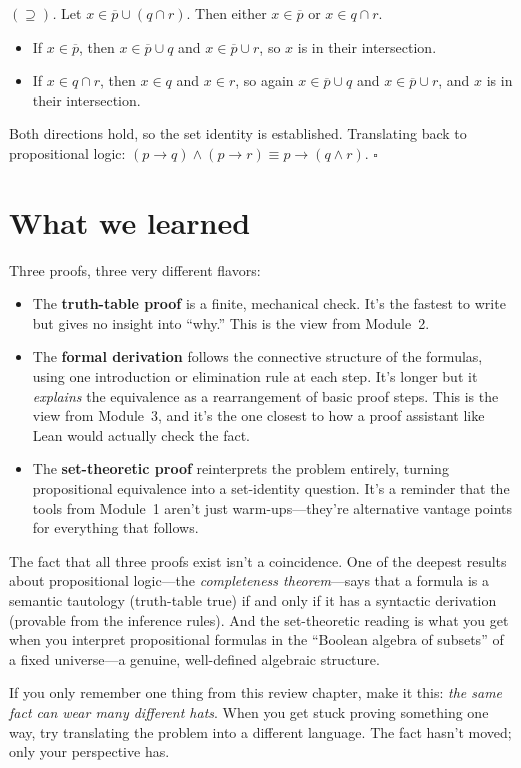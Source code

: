 \documentclass[11pt]{article}
\begin{document}
\emph{$(\supseteq)$.} Let $x \in \overline{p} \cup (q \cap r)$. Then either $x \in \overline{p}$ or $x \in q \cap r$.
\begin{itemize}
  \item If $x \in \overline{p}$, then $x \in \overline{p} \cup q$ and $x \in \overline{p} \cup r$, so $x$ is in their intersection.
  \item If $x \in q \cap r$, then $x \in q$ and $x \in r$, so again $x \in \overline{p} \cup q$ and $x \in \overline{p} \cup r$, and $x$ is in their intersection.
\end{itemize}

Both directions hold, so the set identity is established. Translating back to propositional logic: $(p \to q) \wedge (p \to r) \equiv p \to (q \wedge r)$. \hfill$\square$

\section*{What we learned}

Three proofs, three very different flavors:
\begin{itemize}
  \item The \textbf{truth-table proof} is a finite, mechanical check. It's the fastest to write but gives no insight into ``why.'' This is the view from Module~2.
  \item The \textbf{formal derivation} follows the connective structure of the formulas, using one introduction or elimination rule at each step. It's longer but it \emph{explains} the equivalence as a rearrangement of basic proof steps. This is the view from Module~3, and it's the one closest to how a proof assistant like Lean would actually check the fact.
  \item The \textbf{set-theoretic proof} reinterprets the problem entirely, turning propositional equivalence into a set-identity question. It's a reminder that the tools from Module~1 aren't just warm-ups---they're alternative vantage points for everything that follows.
\end{itemize}

The fact that all three proofs exist isn't a coincidence. One of the deepest results about propositional logic---the \emph{completeness theorem}---says that a formula is a semantic tautology (truth-table true) if and only if it has a syntactic derivation (provable from the inference rules). And the set-theoretic reading is what you get when you interpret propositional formulas in the ``Boolean algebra of subsets'' of a fixed universe---a genuine, well-defined algebraic structure.

If you only remember one thing from this review chapter, make it this: \emph{the same fact can wear many different hats}. When you get stuck proving something one way, try translating the problem into a different language. The fact hasn't moved; only your perspective has.
\end{document}
